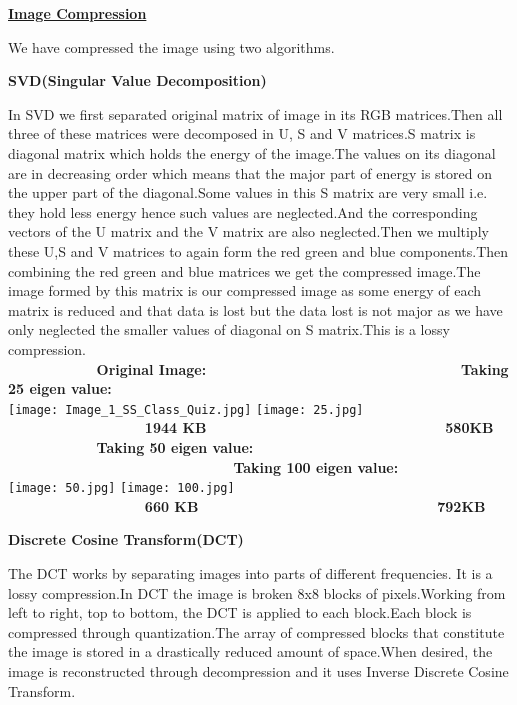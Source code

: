 \documentclass[10pt,a4paper]{article}
\begin{document}
\begin{center}
\underline{\textbf{Image Compression}} 
\end{center}
We have compressed the image using two algorithms.\\
\begin{center}
\textbf{SVD(Singular Value Decomposition)}
\end{center}
In SVD we first separated original matrix of image in its RGB matrices.Then all three of these matrices were decomposed in U, S and V matrices.S matrix is diagonal matrix which holds the energy of the image.The values on its diagonal are in decreasing order which means that the major part of energy is 
stored on the upper part of the diagonal.Some values in this S matrix are very small i.e. they hold less energy hence such values are neglected.And the corresponding vectors of the U matrix and the V matrix are also neglected.Then we multiply these U,S and V matrices to again form the red green and blue components.Then combining the red green and blue matrices we get the compressed image.The image formed by this matrix is our compressed image as some energy of each matrix is reduced and that data is lost but the data lost is not major as we have only neglected the smaller values of diagonal on S matrix.This is a lossy compression.\\
\textbf{\ \ \ \ \ \ \ \ \ \ \ Original Image: \ \ \ \ \ \ \ \ \ \ \ \ \ \ \ \ \ \ \ \ \ \ \ \ \ \ \ \ \ \ \ Taking 25 eigen value:}\\
\texttt{[image: Image\_1\_SS\_Class\_Quiz.jpg]}
\texttt{[image: 25.jpg]}\\

\textbf{\ \ \ \ \ \ \ \ \ \ \ \ \ \ \ \ \ 1944 KB \ \ \ \ \ \ \ \ \  \ \ \ \ \ \ \ \ \ \ \ \ \ \ \ \ \ \ \ \ 580KB}\\
\textbf{\ \ \ \ \ \ \ \ \ \ \ Taking 50 eigen value: \ \ \ \ \ \ \ \ \ \ \ \ \ \ \ \ \ \ \ \ \ \ \ \ \ \ \ \ Taking 100 eigen value:}\\
\texttt{[image: 50.jpg]}
\texttt{[image: 100.jpg]}\\

\textbf{\ \ \ \ \ \ \ \ \ \ \ \ \ \ \ \ \ 660 KB \ \ \ \ \ \ \ \ \  \ \ \ \ \ \ \ \ \ \ \ \ \ \ \ \ \ \ \ \ 792KB}\\
\begin{center}
\textbf{Discrete Cosine Transform(DCT)}
\end{center}
The DCT works by separating images into parts of different frequencies. It is a lossy compression.In DCT the image is broken 8x8 blocks of pixels.Working from left to right, top to bottom, the DCT is applied to each block.Each block is compressed through quantization.The array of compressed blocks that constitute the image is stored in a drastically reduced amount of space.When desired, the image is reconstructed through decompression and it uses Inverse Discrete Cosine Transform.\\
\end{document}
